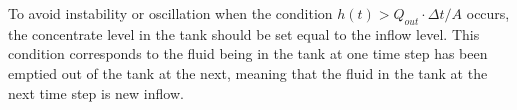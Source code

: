 To avoid instability or oscillation when the condition $h(t) > Q_{out}\cdot \Delta t / A$ occurs, the concentrate level in the tank should be set equal to the inflow level. This condition corresponds to the fluid being in the tank at one time step has been emptied out of the tank at the next, meaning that the fluid in the tank at the next time step is new inflow.  



